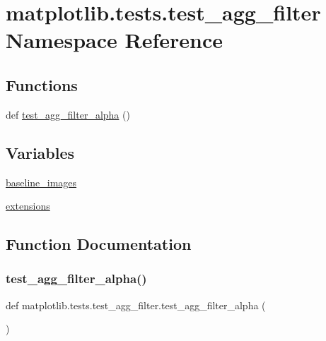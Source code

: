 \hypertarget{namespacematplotlib_1_1tests_1_1test__agg__filter}{}\section{matplotlib.\+tests.\+test\+\_\+agg\+\_\+filter Namespace Reference}
\label{namespacematplotlib_1_1tests_1_1test__agg__filter}
\subsection*{Functions}
\begin{DoxyCompactItemize}
\item 
def \hyperlink{namespacematplotlib_1_1tests_1_1test__agg__filter_a542bee046b45d7e103e2588867039a4d}{test\+\_\+agg\+\_\+filter\+\_\+alpha} ()
\end{DoxyCompactItemize}
\subsection*{Variables}
\begin{DoxyCompactItemize}
\item 
\hyperlink{namespacematplotlib_1_1tests_1_1test__agg__filter_ad7cf8d85317dbd2fe294ab6578ac7814}{baseline\+\_\+images}
\item 
\hyperlink{namespacematplotlib_1_1tests_1_1test__agg__filter_a08d6b9a12f6dca4451d3980925888212}{extensions}
\end{DoxyCompactItemize}


\subsection{Function Documentation}
\mbox{\label{namespacematplotlib_1_1tests_1_1test__agg__filter_a542bee046b45d7e103e2588867039a4d}} 
\subsubsection{\texorpdfstring{test\+\_\+agg\+\_\+filter\+\_\+alpha()}{test\_agg\_filter\_alpha()}}
{\footnotesize\ttfamily def matplotlib.\+tests.\+test\+\_\+agg\+\_\+filter.\+test\+\_\+agg\+\_\+filter\+\_\+alpha (\begin{DoxyParamCaption}{ }\end{DoxyParamCaption})}



